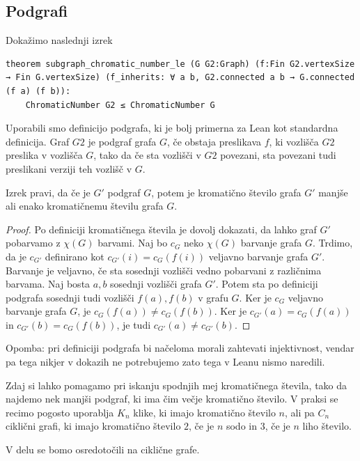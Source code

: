 \documentclass[mat1]{fmfdelo}
\begin{document}
\subsection{Podgrafi}
Dokažimo naslednji izrek
\begin{lstlisting}
theorem subgraph_chromatic_number_le (G G2:Graph) (f:Fin G2.vertexSize → Fin G.vertexSize) (f_inherits: ∀ a b, G2.connected a b → G.connected (f a) (f b)):
    ChromaticNumber G2 ≤ ChromaticNumber G
\end{lstlisting}
Uporabili smo definicijo podgrafa, ki je bolj primerna za Lean kot standardna definicija.
Graf $G2$ je podgraf grafa $G$, če obstaja preslikava $f$, ki vozlišča $G2$ preslika v vozlišča $G$, tako 
da če sta vozlišči v $G2$ povezani, sta povezani tudi preslikani verziji teh vozlišč v $G$.

Izrek pravi, da če je $G'$ podgraf $G$, potem je kromatično število grafa $G'$ manjše ali enako kromatičnemu številu grafa $G$.
\begin{proof}
Po definiciji kromatičnega števila je dovolj dokazati, da lahko graf $G'$ pobarvamo z $\chi(G)$ barvami. Naj bo $c_G$ 
neko $\chi(G)$ barvanje grafa $G$. Trdimo, da je $c_{G'}$ definirano kot $c_{G'}(i) = c_G(f(i))$ veljavno barvanje grafa $G'$. 
Barvanje je veljavno, če sta sosednji vozlišči vedno pobarvani z različnima barvama. Naj bosta $a, b$ sosednji vozlišči grafa $G'$.
Potem sta po definiciji podgrafa sosednji tudi vozlišči $f(a), f(b)$ v grafu $G$. Ker je $c_G$ veljavno barvanje grafa $G$, je 
$c_G(f(a))\neq c_G(f(b))$. Ker je $c_{G'}(a) = c_G(f(a))$ in $c_{G'}(b) = c_G(f(b))$, je tudi $c_{G'}(a)\neq c_{G'}(b)$.
\end{proof}
Opomba: pri definiciji podgrafa bi načeloma morali zahtevati injektivnost, vendar pa tega nikjer v dokazih ne potrebujemo zato
tega v Leanu nismo naredili. 

Zdaj si lahko pomagamo pri iskanju spodnjih mej kromatičnega števila, tako da najdemo nek manjši podgraf, ki 
ima čim večje kromatično število. V praksi se recimo pogosto uporablja $K_n$ klike, ki imajo kromatično število $n$, 
ali pa $C_n$ ciklični grafi, ki imajo kromatično število $2$, če je $n$ sodo in $3$, če je $n$ liho število.

V delu se bomo osredotočili na ciklične grafe.
\end{document}
